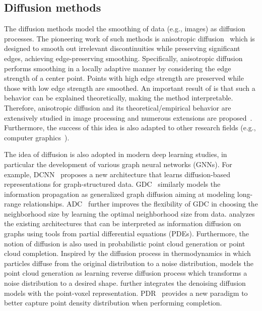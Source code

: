 \documentclass[a4paper,fleqn]{cas-dc}
\begin{document}
\subsection{Diffusion methods}
The diffusion methods model the smoothing of data (e.g., images) as diffusion processes. The pioneering work of such methods is anisotropic diffusion~\cite{perona1990scale} which is designed to smooth out irrelevant discontinuities while preserving significant edges, achieving edge-preserving smoothing. Specifically, anisotropic diffusion performs smoothing in a locally adaptive manner by considering the edge strength of a center point. Points with high edge strength are preserved while those with low edge strength are smoothed. An important result of \cite{perona1990scale} is that such a behavior can be explained theoretically, making the method interpretable. 
Therefore, anisotropic diffusion and its theoretical/empirical behavior are extensively studied in image processing and numerous extensions are proposed~\cite{black1998robust,weickert1998anisotropic,weickert1999coherence,brox2006nonlinear}. Furthermore, the success of this idea is also adapted to other research fields (e.g., computer graphics~\cite{desbrun1999implicit,clarenz2000anisotropic,bajaj2003anisotropic}). 

The idea of diffusion is also adopted in modern deep learning studies, in particular the development of various graph neural networks (GNNs). For example, DCNN~\cite{atwood2016diffusion} proposes a new architecture that learns diffusion-based representations for graph-structured data. GDC~\cite{gasteiger2019diffusion} similarly models the information propagation as generalized graph diffusion aiming at modeling long-range relationships. ADC~\cite{zhao2021adaptive} further improves the flexibility of GDC in choosing the neighborhood size by learning the optimal neighborhood size from data. \cite{chamberlain2021grand} analyzes the existing architectures that can be interpreted as information diffusion on graphs using tools from partial differential equations (PDEs). Furthermore, the notion of diffusion is also used in probabilistic point cloud generation or point cloud completion. Inspired by the diffusion process in thermodynamics in which particles diffuse from the original distribution to a noise distribution, \cite{luo2021diffusion} models the point cloud generation as learning reverse diffusion process which transforms a noise distribution to a desired shape. \cite{zhou20213d} further integrates the denoising diffusion models with the point-voxel representation. PDR~\cite{lyu2022a} provides a new paradigm to better capture point density distribution when performing completion.  
\end{document}
